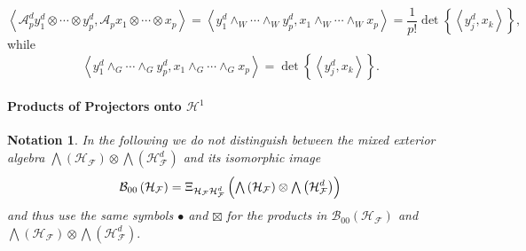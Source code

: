 \documentclass[aps,preprint]{revtex4}%
\newtheorem{notation}[theorem]{Notation}
\begin{document}
\begin{equation}
\left\langle \mathcal{A}_{p}^{d}y_{1}^{d}\otimes\cdots\otimes y_{p}%
^{d},\mathcal{A}_{p}x_{1}\otimes\cdots\otimes x_{p}\right\rangle =\left\langle
y_{1}^{d}\wedge_{W}\cdots\wedge_{W}y_{p}^{d},x_{1}\wedge_{W}\cdots\wedge
_{W}x_{p}\right\rangle =\frac{1}{p!}\det\left\{  \left\langle y_{j}^{d}%
,x_{k}\right\rangle \right\}  ,
\end{equation}
while
\begin{equation}
\left\langle y_{1}^{d}\wedge_{G}\cdots\wedge_{G}y_{p}^{d},x_{1}\wedge
_{G}\cdots\wedge_{G}x_{p}\right\rangle =\det\left\{  \left\langle y_{j}%
^{d},x_{k}\right\rangle \right\}  .
\end{equation}


\paragraph{Products of Projectors onto $\mathcal{H}^{1}$}

\begin{notation}
In the following we do not distinguish between the mixed exterior algebra $%
{\textstyle\bigwedge}
\left(  \mathcal{H}_{\mathcal{F}}\right)  \otimes%
{\textstyle\bigwedge}
\left(  \mathcal{H}_{\mathcal{F}}^{d}\right)  $ and its isomorphic image
\begin{equation}
\mathcal{B}_{00}\left(  \mathcal{H}_{\mathcal{F}}\right)  =\Xi_{\mathcal{H}%
_{\mathcal{F}}\mathcal{H}_{\mathcal{F}}^{d}}\left(  \overset{}{%
{\textstyle\bigwedge}
\left(  \mathcal{H}_{\mathcal{F}}\right)  \otimes%
{\textstyle\bigwedge}
\left(  \mathcal{H}_{\mathcal{F}}^{d}\right)  }\right)
\end{equation}
and thus use the same symbols $\bullet$ and $\boxtimes$ for the products in
$\mathcal{B}_{00}\left(  \mathcal{H}_{\mathcal{F}}\right)  $ and $%
{\textstyle\bigwedge}
\left(  \mathcal{H}_{\mathcal{F}}\right)  \otimes%
{\textstyle\bigwedge}
\left(  \mathcal{H}_{\mathcal{F}}^{d}\right)  .$
\end{notation}
\end{document}
